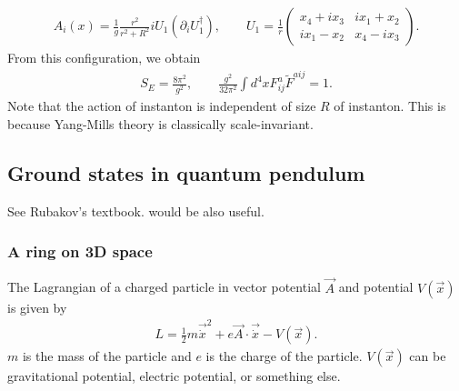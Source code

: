 \documentclass[11pt,a4paper]{article}
\begin{document}
\begin{align}
A_i(x) = \frac{1}{g} \frac{r^2}{r^2 + R^2} i U_1 (\partial_i U_1^\dagger), \qquad
U_1 = \frac{1}{r} \left(\begin{array}{cc}
x_4 + i x_3 & i x_1 + x_2 \\
i x_1 - x_2 & x_4 - i x_3
\end{array}\right).
\end{align}
%
From this configuration, we obtain
\begin{align}
S_E = \frac{8\pi^2}{g^2}, \qquad
\frac{g^2}{32\pi^2} \int d^4x F_{ij}^a \tilde F^{aij} = 1.
\end{align}
%
Note that the action of instanton is independent of size $R$ of instanton. This is because Yang-Mills theory is classically scale-invariant.



\subsection{Ground states in quantum pendulum}
See Rubakov's textbook. \cite{Bachas:2016ffl, Aghaie:2026pkf} would be also useful.

\subsubsection{A ring on 3D space}
The Lagrangian of a charged particle in vector potential $\vec A$ and potential $V(\vec x)$ is given by
\begin{align}
    L = \frac{1}{2} m \vec{\dot x}^2 + e \vec A \cdot \vec{\dot x} - V(\vec x).
\end{align}
$m$ is the mass of the particle and $e$ is the charge of the particle. $V(\vec x)$ can be gravitational potential, electric potential, or something else.
\end{document}
